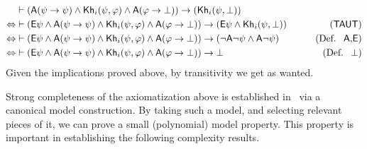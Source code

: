 \begin{align*}
    & \vdash (\A(\psi \ra \psi) \wedge \khi(\psi,\varphi) \wedge \A(\varphi \ra \bot)) \ra (\khi(\psi,\bot)) & \\
    \Leftrightarrow &  \vdash (\E\psi \wedge \A(\psi \ra \psi) \wedge \khi(\psi,\varphi) \wedge \A(\varphi \ra \bot)) \ra (\E\psi \wedge \khi(\psi,\bot)) & \tag{\axm{TAUT}} \\
    \Leftrightarrow & \vdash (\E\psi \wedge \A(\psi \ra \psi) \wedge \khi(\psi,\varphi) \wedge \A(\varphi \ra \bot)) \ra (\neg\A\neg\psi \wedge \A\neg\psi) & \tag{\mbox{Def. } \A,\E} \\
    \Leftrightarrow & \vdash (\E\psi \wedge \A(\psi \ra \psi) \wedge \khi(\psi,\varphi) \wedge \A(\varphi \ra \bot)) \ra \bot & \tag{\mbox{Def. } $\bot$} \\
\end{align*}
%
%
Given the implications proved above, by transitivity we get  as wanted.


Strong completeness of the axiomatization above is established in~\cite{AFSVQ21,AFSVQ23report} via a canonical model construction. By taking such a model, and selecting relevant pieces of it, we can prove a small (polynomial) model property. This property is important in establishing the following complexity results.

\medskip 

